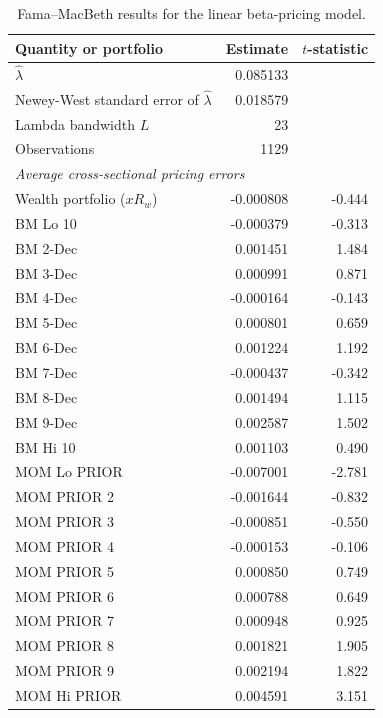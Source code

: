 \begin{table}[htbp]
\centering
\small
\caption{Fama--MacBeth results for the linear beta-pricing model.}
\label{tab:q4e-results}
\begin{tabular}{lrr}
\hline
Quantity or portfolio & Estimate & $t$-statistic \\
\hline
$\widehat{\lambda}$ & 0.085133 & \\
Newey-West standard error of $\widehat{\lambda}$ & 0.018579 & \\
Lambda bandwidth $L$ & 23 & \\
Observations & 1129 & \\
\hline
\multicolumn{3}{l}{\textit{Average cross-sectional pricing errors}} \\
\hline
Wealth portfolio ($xR_w$) & -0.000808 & -0.444 \\
BM Lo 10 & -0.000379 & -0.313 \\
BM 2-Dec & 0.001451 & 1.484 \\
BM 3-Dec & 0.000991 & 0.871 \\
BM 4-Dec & -0.000164 & -0.143 \\
BM 5-Dec & 0.000801 & 0.659 \\
BM 6-Dec & 0.001224 & 1.192 \\
BM 7-Dec & -0.000437 & -0.342 \\
BM 8-Dec & 0.001494 & 1.115 \\
BM 9-Dec & 0.002587 & 1.502 \\
BM Hi 10 & 0.001103 & 0.490 \\
MOM Lo PRIOR & -0.007001 & -2.781 \\
MOM PRIOR 2 & -0.001644 & -0.832 \\
MOM PRIOR 3 & -0.000851 & -0.550 \\
MOM PRIOR 4 & -0.000153 & -0.106 \\
MOM PRIOR 5 & 0.000850 & 0.749 \\
MOM PRIOR 6 & 0.000788 & 0.649 \\
MOM PRIOR 7 & 0.000948 & 0.925 \\
MOM PRIOR 8 & 0.001821 & 1.905 \\
MOM PRIOR 9 & 0.002194 & 1.822 \\
MOM Hi PRIOR & 0.004591 & 3.151 \\
\hline
\end{tabular}
\end{table}
